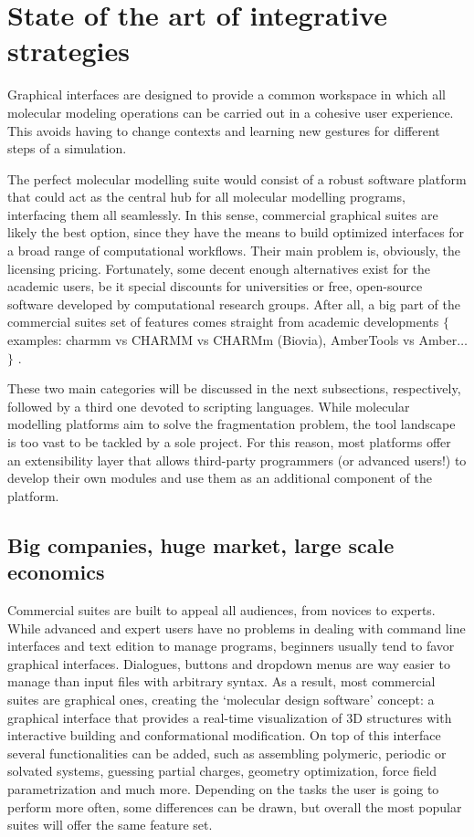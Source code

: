 \section{State of the art of integrative strategies}
Graphical interfaces are designed to provide a common workspace in which all molecular modeling operations can be carried out in a cohesive user experience. This avoids having to change contexts and learning new gestures for different steps of a simulation.

The perfect molecular modelling suite would consist of a robust software platform that could act as the central hub for all molecular modelling programs, interfacing them all seamlessly. In this sense, commercial graphical suites are likely the best option, since they have the means to build optimized interfaces for a broad range of computational workflows. Their main problem is, obviously, the licensing pricing. Fortunately, some decent enough alternatives exist for the academic users, be it special discounts for universities or free, open-source software developed by computational research groups. After all, a big part of the commercial suites set of features comes straight from academic developments $ \{ $ examples: charmm vs CHARMM vs CHARMm (Biovia), AmberTools vs Amber$ \ldots $ $ \} $ .

These two main categories will be discussed in the next subsections, respectively, followed by a third one devoted to scripting languages. While molecular modelling platforms aim to solve the fragmentation problem, the tool landscape is too vast to be tackled by a sole project. For this reason, most platforms offer an extensibility layer that allows third-party programmers (or advanced users!) to develop their own modules and use them as an additional component of the platform.

\subsection{Big companies, huge market, large scale economics}
Commercial suites are built to appeal all audiences, from novices to experts. While advanced and expert users have no problems in dealing with command line interfaces and text edition to manage programs, beginners usually tend to favor graphical interfaces. Dialogues, buttons and dropdown menus are way easier to manage than input files with arbitrary syntax. As a result, most commercial suites are graphical ones, creating the ‘molecular design software’ concept: a graphical interface that provides a real-time visualization of 3D structures with interactive building and conformational modification. On top of this interface several functionalities can be added, such as assembling polymeric, periodic or solvated systems, guessing partial charges, geometry optimization, force field parametrization and much more. Depending on the tasks the user is going to perform more often, some differences can be drawn, but overall the most popular suites will offer the same feature set.

